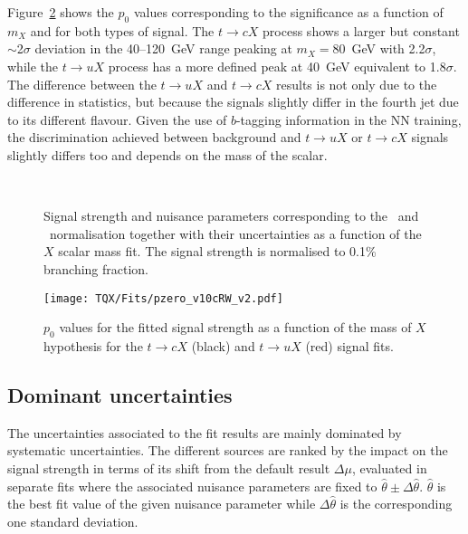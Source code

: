 Figure~\ref{tqX:p0values} shows the $p_0$ values corresponding to the significance as a function of $m_X$ and for both types of signal. The $t\to cX$ process shows a larger but constant $\sim$2$\sigma$ deviation in the 40--120~GeV range peaking at $m_X=80$~GeV with 2.2$\sigma$, while the $t\to uX$ process has a more defined peak at 40~GeV equivalent to 1.8$\sigma$. The difference between the $t\to uX$ and $t\to cX$ results is not only due to the difference in statistics, but because the signals slightly differ in the fourth jet due to its different flavour. Given the use of $b$-tagging information in the NN training, the discrimination achieved between background and $t\to uX$ or $t\to cX$ signals slightly differs too and depends on the mass of the scalar.\\

\begin{figure}[htb]
    \RawFloats
    \centering
    \\
    \caption{Signal strength and nuisance parameters corresponding to the \ttb\ and \ttc\ normalisation together with their uncertainties as a function of the $X$ scalar mass fit. The signal strength is normalised to 0.1\% branching fraction.
    }
    \label{tqX:fittedfactorsvsmass}
\end{figure}

\begin{figure}[htb]
    \RawFloats
    \centering
    \texttt{[image: TQX/Fits/pzero\_v10cRW\_v2.pdf]}
    \caption{$p_0$ values for the fitted signal strength as a function of the mass of $X$ hypothesis for the $t\to cX$ (black) and $t\to uX$ (red) signal fits.}
    \label{tqX:p0values}
\end{figure}
\clearpage
\subsection{Dominant uncertainties}

The uncertainties associated to the fit results are mainly dominated by systematic uncertainties. The different sources are ranked by the impact on the signal strength in terms of its shift from the default result $\Delta\mu$, evaluated in separate fits where the associated nuisance parameters are fixed to $\hat{\theta}\pm\Delta\hat{\theta}$. $\hat{\theta}$ is the best fit value of the given nuisance parameter while $\Delta\hat{\theta}$ is the corresponding one standard deviation.\\

